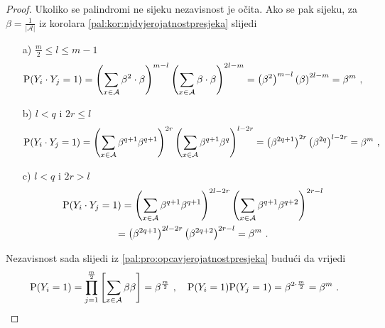 \begin{proof}
	Ukoliko se palindromi ne sijeku	nezavisnost je očita.
	Ako se pak sijeku,
	za $\beta=\frac{1}{|\mathcal{A}|}$
	iz korolara \ref{pal:kor:njdvjerojatnostpresjeka} slijedi
	\begin{itemize}
		\item[a)]{
			 $\frac{m}{2} \leq l \leq m-1$
			\[
				\vP (\tsvar{Y}_i \cdot \tsvar{Y}_j =1 ) =
				\left(
					\sum_{x \in \mathcal{A}} \beta^2 \cdot \beta 
				\right)^{m-l}
				\left(
					\sum_{x \in \mathcal{A}} \beta \cdot \beta 
				\right)^{2l-m}
				=
				\left(
					\beta^2
				\right)^{m-l}
				\left(
					\beta
				\right)^{2l-m}
				=
				\beta^{m} \ ,
			\]
		}
		\item[b)]{
			 $l < q$ i $2r \leq l$
			\[
				\vP (\tsvar{Y}_i \cdot \tsvar{Y}_j =1 ) =
				\left(
				\sum_{x \in \mathcal{A}} \beta^{q+1} \beta^{q+1} 
				\right)^{2r}
				\left(
				\sum_{x \in \mathcal{A}} \beta^{q+1} \beta^{q} 
				\right)^{l-2r}
				=
				\left(
				\beta^{2q+1} 
				\right)^{2r}
				\left(
				\beta^{2q}
				\right)^{l-2r}
				=
				\beta^{m} \ ,
			\]
		}
		\item[c)]{
			 $l < q$ i $2r > l$
			\begin{multline*}	
				\vP (\tsvar{Y}_i \cdot \tsvar{Y}_j =1 ) =
				\left(
				\sum_{x \in \mathcal{A}} \beta^{q+1} \beta^{q+1} 
				\right)^{2l-2r}
				\left(
				\sum_{x \in \mathcal{A}} \beta^{q+1} \beta^{q+2} 
				\right)^{2r-l}
				\\
				=
				\left(
				\beta^{2q+1}
				\right)^{2l-2r}
				\left(
				\beta^{2q+2}
				\right)^{2r-l}
				=
				\beta^{m} \ .
			\end{multline*}
		}
	\end{itemize}
	Nezavisnost sada slijedi iz 
	\ref{pal:pro:opcavjerojatnostpresjeka}
	budući da vrijedi
	\[
		\vP( \tsvar{Y}_i = 1) =
		\prod_{j=1}^{\frac{m}{2}} \left[
		\sum_{x \in \mathcal{A}}
		\beta \beta
		\right]
		=
		\beta^{\frac{m}{2}} \ , \quad
		\vP( \tsvar{Y}_i = 1) \vP(\tsvar{Y}_j = 1)
		= \beta^{2 \cdot \frac{m}{2}} = \beta^{m} \ .
	\]
\end{proof}
